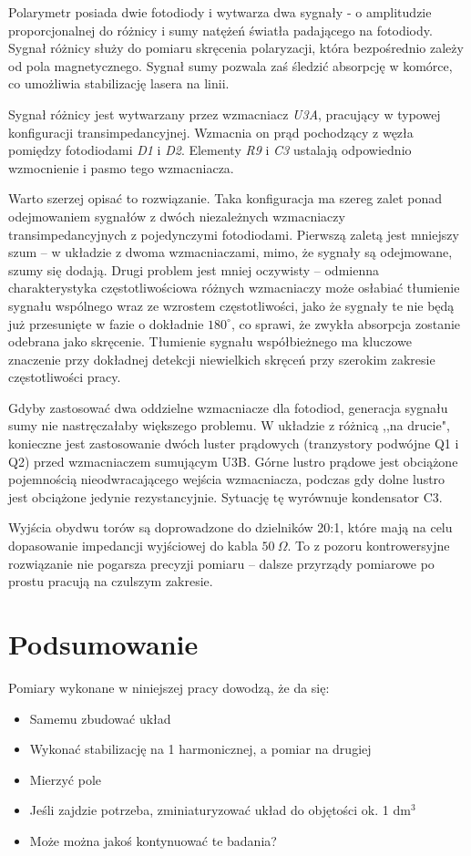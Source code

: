 \documentclass[a4paper,10pt,twoside]{article}
\begin{document}
Polarymetr posiada dwie fotodiody i wytwarza dwa sygnały - o amplitudzie proporcjonalnej do różnicy i sumy natężeń światła padającego na fotodiody.
Sygnał różnicy służy do pomiaru skręcenia polaryzacji, która bezpośrednio zależy od pola magnetycznego.  Sygnał sumy pozwala zaś śledzić absorpcję w komórce, co umożliwia stabilizację lasera na linii.

Sygnał różnicy jest wytwarzany przez wzmacniacz \textit{U3A}, pracujący w typowej konfiguracji transimpedancyjnej. Wzmacnia on prąd pochodzący z węzła pomiędzy fotodiodami \textit{D1} i \textit{D2}.
Elementy \textit{R9} i \textit{C3} ustalają odpowiednio wzmocnienie i pasmo tego wzmacniacza.

Warto szerzej opisać to rozwiązanie. Taka konfiguracja ma szereg zalet ponad odejmowaniem sygnałów z dwóch niezależnych wzmacniaczy transimpedancyjnych z pojedynczymi fotodiodami.
Pierwszą zaletą jest mniejszy szum -- w układzie z dwoma wzmacniaczami, mimo, że sygnały są odejmowane, szumy się dodają. Drugi problem jest mniej oczywisty -- odmienna charakterystyka częstotliwościowa różnych wzmacniaczy może osłabiać tłumienie sygnału wspólnego wraz ze wzrostem częstotliwości, jako że sygnały te nie będą już przesunięte w fazie o dokładnie $180^{\circ}$, co sprawi, że zwykła absorpcja zostanie odebrana jako skręcenie. Tłumienie sygnału współbieżnego ma kluczowe znaczenie przy dokładnej detekcji niewielkich skręceń przy szerokim zakresie częstotliwości pracy.

Gdyby zastosować dwa oddzielne wzmacniacze dla fotodiod, generacja sygnału sumy nie nastręczałaby większego problemu. W układzie z różnicą ,,na drucie", konieczne jest zastosowanie dwóch luster prądowych (tranzystory podwójne Q1 i Q2) przed wzmacniaczem sumującym U3B. Górne lustro prądowe jest obciążone pojemnością nieodwracającego wejścia wzmacniacza, podczas gdy dolne lustro jest obciążone jedynie rezystancyjnie. Sytuację tę wyrównuje kondensator C3. 

Wyjścia obydwu torów są doprowadzone do dzielników 20:1, które mają na celu dopasowanie impedancji wyjściowej do kabla $50~\Omega$. To z pozoru kontrowersyjne rozwiązanie nie pogarsza precyzji pomiaru -- dalsze przyrządy pomiarowe po prostu pracują na czulszym zakresie.


\section{Podsumowanie}

Pomiary wykonane w niniejszej pracy dowodzą, że da się:
\begin{itemize}
\item Samemu zbudować układ
\item Wykonać stabilizację na 1 harmonicznej, a pomiar na drugiej
\item Mierzyć pole
\item Jeśli zajdzie potrzeba, zminiaturyzować układ do objętości ok. 1 dm${}^3$
\item Może można jakoś kontynuować te badania?
\end{itemize}
\end{document}
